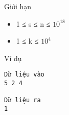 Giới hạn  
\begin{itemize}
	\item     1 ≤ s ≤ n ≤ $10^{18}$
	\item     1 ≤ k ≤ $10^{4}$
\end{itemize}
   Ví dụ  
\begin{verbatim}
Dữ liệu vào
5 2 4

Dữ liệu ra
1
\end{verbatim}